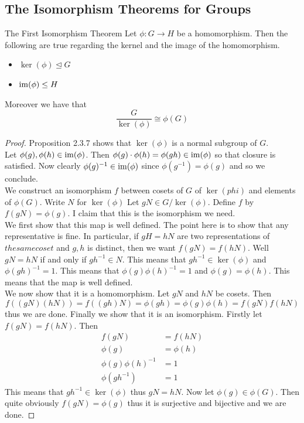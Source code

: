 \documentclass[a4paper]{article}
\begin{document}
\subsection{The Isomorphism Theorems for Groups}
\begin{thm}{The First Isomorphism Theorem}{} Let $\phi:G\to H$ be a homomorphism. Then the following are true regarding the kernel and the image of the homomorphism. 
\begin{itemize}
\item $\ker(\phi)\trianglelefteq G$
\item $\operatorname{im}(\phi)\leq H$
\end{itemize} 
Moreover we have that $$\frac{G}{\ker(\phi)}\cong\phi(G)$$ 
\begin{proof}
Proposition 2.3.7 shows that $\ker(\phi)$ is a normal subgroup of $G$. \\

Let $\phi(g),\phi(h)\in\operatorname{im}(\phi)$. Then $\phi(g)\cdot\phi(h)=\phi(gh)\in\operatorname{im}(\phi)$ so that closure is satisfied. Now clearly $\phi(g)^{-1}\in\operatorname{im}(\phi)$ since $\phi(g^{-1})=\phi(g)$ and so we conclude. \\

We construct an isomorphism $f$ between cosets of $G$ of $\ker(phi)$ and elements of $\phi(G)$. Write $N$ for $\ker(\phi)$ Let $gN\in G/\ker(\phi)$. Define $f$ by $f(gN)=\phi(g)$. I claim that this is the isomorphism we need. \\
We first show that this map is well defined. The point here is to show that any representative is fine. In particular, if $gH=hN$ are two representations of $the same coset$ and $g,h$ is distinct, then we want $f(gN)=f(hN)$. Well $gN=hN$ if and only if $gh^{-1}\in N$. This means that $gh^{-1}\in\ker(\phi)$ and $\phi(gh)^{-1}=1$. This means that $\phi(g)\phi(h)^{-1}=1$ and $\phi(g)=\phi(h)$. This means that the map is well defined. \\
We now show that it is a homomorphism. Let $gN$ and $hN$ be cosets. Then $$f((gN)(hN))=f((gh)N)=\phi(gh)=\phi(g)\phi(h)=f(gN)f(hN)$$ thus we are done. Finally we show that it is an isomorphism. Firstly let $f(gN)=f(hN)$. Then
\begin{align*}
f(gN)&=f(hN)\\
\phi(g)&=\phi(h)\\
\phi(g)\phi(h)^{-1}&=1\\
\phi(gh^{-1})&=1
\end{align*}
This means that $gh^{-1}\in\ker(\phi)$ thus $gN=hN$. Now let $\phi(g)\in\phi(G)$. Then quite obviously $f(gN)=\phi(g)$ thus it is surjective and bijective and we are done. 
\end{proof}
\end{thm}
\end{document}

